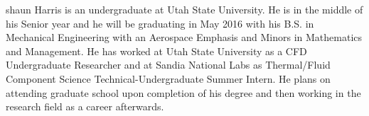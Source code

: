 shaun Harris is an undergraduate at Utah State University.  He is in the middle of his Senior year and he will be graduating in May 2016 with his B.S. in Mechanical Engineering with an Aerospace Emphasis and Minors in Mathematics and Management.  He has worked at Utah State University as a CFD Undergraduate Researcher and at Sandia National Labs as Thermal/Fluid Component Science Technical-Undergraduate Summer Intern.  He plans on attending graduate school upon completion of his degree and then working in the research field as a career afterwards.
